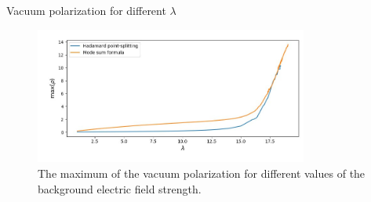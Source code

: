 \begin{frame}{Vacuum polarization for different $\lambda$}
	\begin{figure}[h]
		\centering
		\includegraphics[width=0.8\textwidth]{figures/different-lambda-rho.png}
		\caption{The maximum of the vacuum polarization for different values of the background electric field strength.}
		\label{fig:figures-different-lambda-rho-png}
	\end{figure}
\end{frame}
